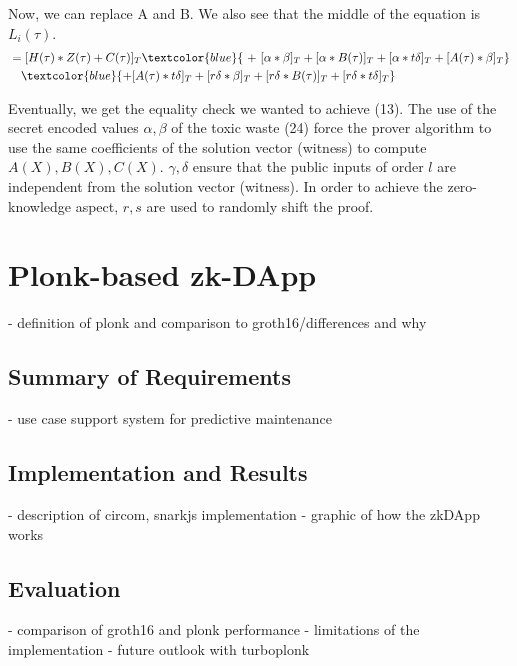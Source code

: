 Now, we can replace A and B. We also see that the middle of the equation is \(L_i(\tau)\).
 \begin{equation*}
     \begin{split}
     &=[H(\tau) * Z(\tau) + C(\tau)]_T \textcolor{blue}{\ +\  [\alpha * \beta]_T + [\alpha * B(\tau)]_T + [\alpha * t\delta]_T + [A(\tau) * \beta]_T} \\
     &\ \ \ \textcolor{blue}{+ [A(\tau) * t\delta]_T + [r\delta * \beta]_T + [r\delta * B(\tau)]_T + [r\delta * t\delta]_T}
     \end{split}
 \end{equation*}

Eventually, we get the equality check we wanted to achieve (13). The use of the secret encoded values \(\alpha, \beta\) of the toxic waste (24) force the prover algorithm to use the same coefficients of the solution vector (witness) to compute \(A(X), B(X), C(X)\). \(\gamma, \delta\) ensure that the public inputs of order \(l\) are independent from the solution vector (witness). In order to achieve the zero-knowledge aspect, \(r, s\) are used to randomly shift the proof.
    


    

\section{Plonk-based zk-DApp}
- definition of plonk and comparison to groth16/differences and why
\subsection{Summary of Requirements}
- use case support system for predictive maintenance
\subsection{Implementation and Results}
- description of circom, snarkjs implementation
- graphic of how the zkDApp works
\subsection{Evaluation}
- comparison of groth16 and plonk performance
- limitations of the implementation
- future outlook with turboplonk

